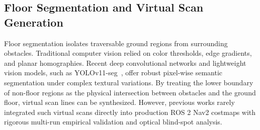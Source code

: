 \subsection{Floor Segmentation and Virtual Scan Generation}
Floor segmentation isolates traversable ground regions from surrounding obstacles. Traditional computer vision relied on color thresholds, edge gradients, and planar homographies. Recent deep convolutional networks and lightweight vision models, such as YOLOv11-seg~\cite{ultralytics2024yolo11}, offer robust pixel-wise semantic segmentation under complex textural variations. By treating the lower boundary of non-floor regions as the physical intersection between obstacles and the ground floor, virtual scan lines can be synthesized. However, previous works rarely integrated such virtual scans directly into production ROS 2 Nav2 costmaps with rigorous multi-run empirical validation and optical blind-spot analysis.
